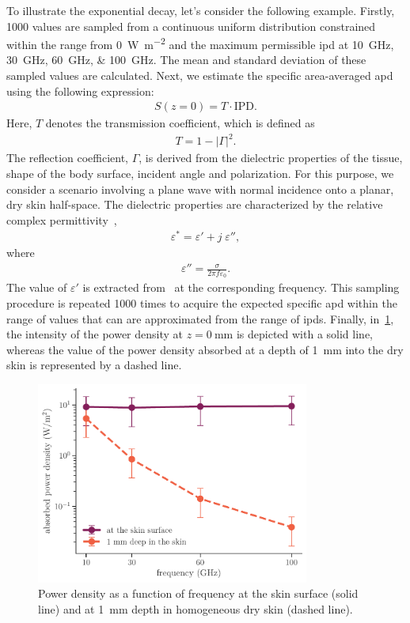 To illustrate the exponential decay, let's consider the following example.
Firstly, \num{1000} values are sampled from a continuous uniform distribution constrained within the range from \SI{0}{\watt\per\m\squared} and the maximum permissible \gls{ipd} at \SIlist{10;30;60;100}{\GHz}.
The mean and standard deviation of these sampled values are calculated.
Next, we estimate the specific area-averaged \gls{apd} using the following expression:
\begin{align}
    \label{eqn:specific_apd_approx}
    S(z=0) = T \cdot \text{IPD}.
\end{align}
Here, $T$ denotes the transmission coefficient, which is defined as
\begin{align}
    \label{eqn:transmittance}
    T = 1 - \left| \Gamma \right|^2.
\end{align}
The reflection coefficient,  $\Gamma$, is derived from the dielectric properties of the tissue, shape of the body surface, incident angle and polarization.
For this purpose, we consider a scenario involving a plane wave with normal incidence onto a planar, dry skin half-space.
The dielectric properties are characterized by the relative complex permittivity~\cite{Wu2015human},
\begin{align}
    \label{eqn:rel_complex_permittivity}
    \varepsilon^* = \varepsilon' + j \; \varepsilon'',
\end{align}
where
\begin{align}
    \varepsilon'' = \frac{\sigma}{2 \pi f \varepsilon_0}.
\end{align}
The value of $\varepsilon'$ is extracted from~\cite{Gabriel1996Compilation} at the corresponding frequency. 
This sampling procedure is repeated \num{1000} times to acquire the expected specific \gls{apd} within the range of values that can are approximated from the range of \gls{ipd}s.
Finally, in~\cref{fig:power_density_absorption}, the intensity of the power density at $z=\SI{0}{\mm}$ is depicted with a solid line, whereas the value of the power density absorbed at a depth of \SI{1}{\mm} into the dry skin is represented by a dashed line.
\begin{figure}[ht]
    \centering
    \includegraphics[width=0.8\textwidth]{artwork/power_density_absorption.pdf}
    \caption{Power density as a function of frequency at the skin surface (solid line) and at \SI{1}{\mm} depth in homogeneous dry skin (dashed line).}
    \label{fig:power_density_absorption}
\end{figure}
